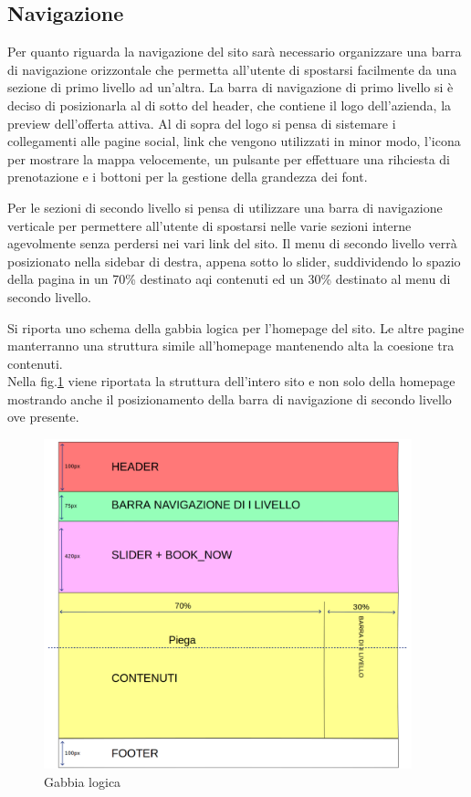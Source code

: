 \documentclass[a4paper,12pt,hidelinks]{report}
\begin{document}
\subsection{Navigazione}
Per quanto riguarda la navigazione del sito sarà necessario organizzare una barra di navigazione orizzontale che permetta all'utente di spostarsi facilmente da una sezione di primo livello
ad un'altra. La barra di navigazione di primo livello si è deciso di posizionarla al di sotto del header, che contiene il logo dell'azienda, la preview dell'offerta attiva. Al di sopra del logo
si pensa di sistemare i collegamenti alle pagine social, link che vengono utilizzati in minor modo, l'icona per mostrare la mappa velocemente, un pulsante per effettuare una rihciesta di prenotazione
e i bottoni per la gestione della grandezza dei font.
\par Per le sezioni di secondo livello si pensa di utilizzare una barra di navigazione verticale per permettere all'utente di spostarsi nelle varie sezioni interne agevolmente senza
perdersi nei vari link del sito. Il menu di secondo livello verrà posizionato nella sidebar di destra, appena sotto lo slider, suddividendo lo spazio della pagina in un 70\% destinato aqi contenuti
ed un 30\% destinato al menu di secondo livello.
\par Si riporta uno schema della gabbia logica per l'homepage del sito. Le altre pagine manterranno una struttura simile all'homepage mantenendo alta la coesione tra contenuti.
\\Nella fig.\ref{fig:gabbiaLogica} viene riportata la struttura dell'intero sito e non solo della homepage mostrando anche il posizionamento della barra di navigazione di secondo livello ove presente.
\begin{figure}[h!]%
	\includegraphics[width=0.95\textwidth,keepaspectratio=true]{img/gabbiaLogica}
	\centering
	\caption{Gabbia logica}%
	\label{fig:gabbiaLogica}%
\end{figure}
\newpage
\end{document}
